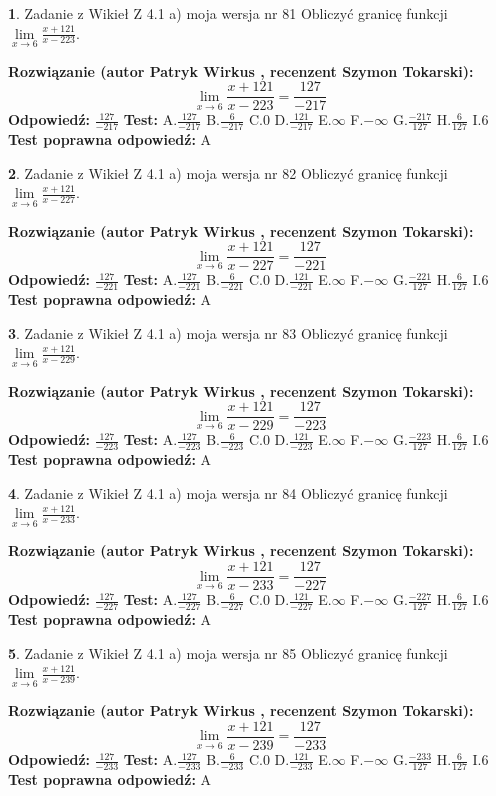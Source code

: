 \documentclass[12pt, a4paper]{article}
\theoremstyle{definition} %
\newtheorem{zad}{}
\newcommand{\zadStart}[1]{\begin{zad}#1\newline}
\newcommand{\zadStop}{\end{zad}}
\newcommand{\rozwStart}[2]{\noindent \textbf{Rozwiązanie (autor #1 , recenzent #2): }\newline}
\newcommand{\rozwStop}{\newline}
\newcommand{\odpStart}{\noindent \textbf{Odpowiedź:}\newline}
\newcommand{\odpStop}{\newline}
\newcommand{\testStart}{\noindent \textbf{Test:}\newline}
\newcommand{\testStop}{\newline}
\newcommand{\kluczStart}{\noindent \textbf{Test poprawna odpowiedź:}\newline}
\newcommand{\kluczStop}{\newline}
\begin{document}
\zadStart{Zadanie z Wikieł Z 4.1 a) moja wersja nr 81}
Obliczyć granicę funkcji $\lim\limits_{x\to6}\frac{x+121}{x-223}$.
\zadStop
\rozwStart{Patryk Wirkus}{Szymon Tokarski}
$$\lim\limits_{x\to6}\frac{x+121}{x-223} = \frac{127}{-217}$$
\rozwStop
\odpStart
$\frac{127}{-217}$
\odpStop
\testStart
A.$\frac{127}{-217}$
B.$\frac{6}{-217}$
C.$0$
D.$\frac{121}{-217}$
E.$\infty$
F.$-\infty$
G.$\frac{-217}{127}$
H.$\frac{6}{127}$
I.$6$
\testStop
\kluczStart
A
\kluczStop



\zadStart{Zadanie z Wikieł Z 4.1 a) moja wersja nr 82}
Obliczyć granicę funkcji $\lim\limits_{x\to6}\frac{x+121}{x-227}$.
\zadStop
\rozwStart{Patryk Wirkus}{Szymon Tokarski}
$$\lim\limits_{x\to6}\frac{x+121}{x-227} = \frac{127}{-221}$$
\rozwStop
\odpStart
$\frac{127}{-221}$
\odpStop
\testStart
A.$\frac{127}{-221}$
B.$\frac{6}{-221}$
C.$0$
D.$\frac{121}{-221}$
E.$\infty$
F.$-\infty$
G.$\frac{-221}{127}$
H.$\frac{6}{127}$
I.$6$
\testStop
\kluczStart
A
\kluczStop



\zadStart{Zadanie z Wikieł Z 4.1 a) moja wersja nr 83}
Obliczyć granicę funkcji $\lim\limits_{x\to6}\frac{x+121}{x-229}$.
\zadStop
\rozwStart{Patryk Wirkus}{Szymon Tokarski}
$$\lim\limits_{x\to6}\frac{x+121}{x-229} = \frac{127}{-223}$$
\rozwStop
\odpStart
$\frac{127}{-223}$
\odpStop
\testStart
A.$\frac{127}{-223}$
B.$\frac{6}{-223}$
C.$0$
D.$\frac{121}{-223}$
E.$\infty$
F.$-\infty$
G.$\frac{-223}{127}$
H.$\frac{6}{127}$
I.$6$
\testStop
\kluczStart
A
\kluczStop



\zadStart{Zadanie z Wikieł Z 4.1 a) moja wersja nr 84}
Obliczyć granicę funkcji $\lim\limits_{x\to6}\frac{x+121}{x-233}$.
\zadStop
\rozwStart{Patryk Wirkus}{Szymon Tokarski}
$$\lim\limits_{x\to6}\frac{x+121}{x-233} = \frac{127}{-227}$$
\rozwStop
\odpStart
$\frac{127}{-227}$
\odpStop
\testStart
A.$\frac{127}{-227}$
B.$\frac{6}{-227}$
C.$0$
D.$\frac{121}{-227}$
E.$\infty$
F.$-\infty$
G.$\frac{-227}{127}$
H.$\frac{6}{127}$
I.$6$
\testStop
\kluczStart
A
\kluczStop



\zadStart{Zadanie z Wikieł Z 4.1 a) moja wersja nr 85}
Obliczyć granicę funkcji $\lim\limits_{x\to6}\frac{x+121}{x-239}$.
\zadStop
\rozwStart{Patryk Wirkus}{Szymon Tokarski}
$$\lim\limits_{x\to6}\frac{x+121}{x-239} = \frac{127}{-233}$$
\rozwStop
\odpStart
$\frac{127}{-233}$
\odpStop
\testStart
A.$\frac{127}{-233}$
B.$\frac{6}{-233}$
C.$0$
D.$\frac{121}{-233}$
E.$\infty$
F.$-\infty$
G.$\frac{-233}{127}$
H.$\frac{6}{127}$
I.$6$
\testStop
\kluczStart
A
\kluczStop
\end{document}
